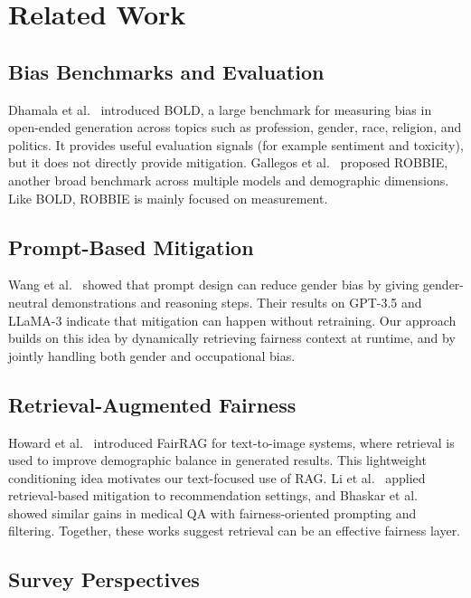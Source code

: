 \documentclass[conference]{IEEEtran}
\begin{document}
\section{Related Work}

\subsection{Bias Benchmarks and Evaluation}

Dhamala et al.~\cite{bold2021} introduced BOLD, a large benchmark for measuring bias in open-ended generation across topics such as profession, gender, race, religion, and politics. It provides useful evaluation signals (for example sentiment and toxicity), but it does not directly provide mitigation. Gallegos et al.~\cite{robbie2023} proposed ROBBIE, another broad benchmark across multiple models and demographic dimensions. Like BOLD, ROBBIE is mainly focused on measurement.

\subsection{Prompt-Based Mitigation}

Wang et al.~\cite{drgap2023} showed that prompt design can reduce gender bias by giving gender-neutral demonstrations and reasoning steps. Their results on GPT-3.5 and LLaMA-3 indicate that mitigation can happen without retraining. Our approach builds on this idea by dynamically retrieving fairness context at runtime, and by jointly handling both gender and occupational bias.

\subsection{Retrieval-Augmented Fairness}

Howard et al.~\cite{fairrag2024} introduced FairRAG for text-to-image systems, where retrieval is used to improve demographic balance in generated results. This lightweight conditioning idea motivates our text-focused use of RAG. Li et al.~\cite{bias_rec2024} applied retrieval-based mitigation to recommendation settings, and Bhaskar et al.~\cite{medqa2025} showed similar gains in medical QA with fairness-oriented prompting and filtering. Together, these works suggest retrieval can be an effective fairness layer.

\subsection{Survey Perspectives}
\end{document}
